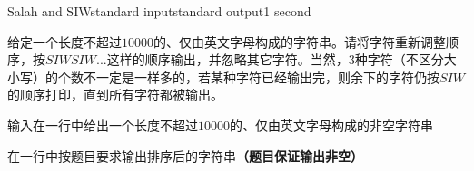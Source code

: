 \begin{problem}{Salah and SIW}{standard input}{standard output}{1 second}

给定一个长度不超过$10000$的、仅由英文字母构成的字符串。请将字符重新调整顺序，按$SIWSIW...$这样的顺序输出，并忽略其它字符。当然，$3$种字符（不区分大小写）的个数不一定是一样多的，若某种字符已经输出完，则余下的字符仍按$SIW$的顺序打印，直到所有字符都被输出。

\InputFile

输入在一行中给出一个长度不超过$10000$的、仅由英文字母构成的非空字符串

\OutputFile

在一行中按题目要求输出排序后的字符串\textbf{（题目保证输出非空）}

\Examples

\begin{example}
%
%
\end{example}
\end{problem}
